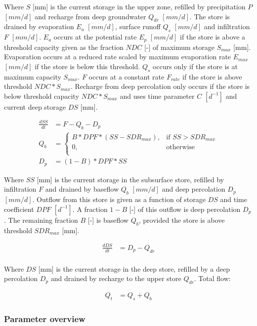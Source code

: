 Where $S$ [mm] is the current storage in the upper zone, refilled by precipitation $P$ $[mm/d]$ and recharge from deep groundwater $Q_{dr}$ $[mm/d]$. 
The store is drained by evaporation $E_a$ $[mm/d]$, surface runoff $Q_{s}$ $[mm/d]$ and infiltration $F$ $[mm/d]$.
$E_a$ occurs at the potential rate $E_p$ $[mm/d]$ if the store is above a threshold capacity given as the fraction $NDC$ [-] of maximum storage $S_{max}$ [mm].
Evaporation occurs at a reduced rate scaled by maximum evaporation rate $E_{max}$ $[mm/d]$ if the store is below this threshold.
$Q_s$ occurs only if the store is at maximum capacity $S_{max}$. 
$F$ occurs at a constant rate $F_{rate}$ if the store is above threshold $NDC*S_{max}$.
Recharge from deep percolation only occurs if the store is below threshold capacity $NDC*S_{max}$ and uses time parameter $C$ $[d^{-1}]$ and current deep storage $DS$ [mm].

\begin{align}
	\frac{dSS}{dt} &=F - Q_b-D_p\\
	Q_b &= \begin{cases}
		B*DPF*(SS-SDR_{max}), &\text{if } SS > SDR_{max} \\
		0, & \text{otherwise} \\
	\end{cases} \\
	D_p &= (1-B)*DPF*SS
\end{align}

Where $SS$ [mm] is the current storage in the subsurface store, refilled by infiltration $F$ and drained by baseflow $Q_b$ $[mm/d]$ and deep percolation $D_p$ $[mm/d]$.
Outflow from this store is given as a function of storage $DS$ and time coefficient  $DPF$ $[d^{-1}]$.
A fraction $1-B$ [-] of this outflow is deep percolation $D_p$.
The remaining fraction $B$ [-] is baseflow $Q_b$, provided the store is above threshold $SDR_{max}$ [mm].

\begin{align}
	\frac{dDS}{dt} &= D_p - Q_{dr}  \\
\end{align}
  
Where $DS$ [mm] is the current storage in the deep store, refilled by a deep percolation $D_p$ and drained by recharge to the upper store $Q_{dr}$.
Total flow:

\begin{align}
	Q_t &= Q_s+Q_b
\end{align}

\subsubsection{Parameter overview}

